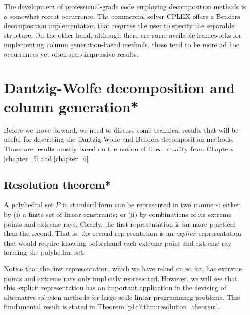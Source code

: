 The development of professional-grade code employing decomposition methods is a somewhat recent occurrence. The commercial solver CPLEX offers a Benders decomposition implementation that requires the user to specify the separable structure. On the other hand, although there are some available frameworks for implementing column generation-based methods, these tend to be more ad hoc occurrences yet often reap impressive results.  


\section{Dantzig-Wolfe decomposition and column generation*} \label{section_72}

Before we move forward, we need to discuss some technical results that will be useful for describing the Dantzig-Wolfe and Benders decomposition methods. Those are results mostly based on the notion of linear duality from Chapters \ref{chapter_5} and \ref{chapter_6}.

\subsection{Resolution theorem*}


A polyhedral set $P$ in standard form can be represented in two manners: either by (i) a finite set of linear constraints; or (ii) by combinations of its extreme points and extreme rays. Clearly, the first representation is far more practical than the second. That is, the second representation is an \emph{explicit} representation that would require knowing beforehand each extreme point and extreme ray forming the polyhedral set. 

Notice that the first representation, which we have relied on so far, has extreme points and extreme rays only implicitly represented. However, we will see that this explicit representation has an important application in the devising of alternative solution methods for large-scale linear programming problems. This fundamental result is stated in Theorem \ref{p1c7:thm:resolution_theorem}. 

